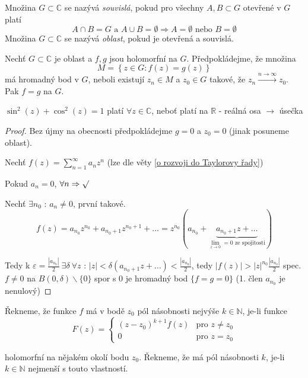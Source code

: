 \begin{definice}
Množina $G \subset \mathbb{C}$ se nazývá \emph{souvislá}, pokud pro všechny $A, B \subset G$ otevřené v $G$ platí
$$A \cap B = G \textrm{ a } A \cup B = \emptyset \Rightarrow A = \emptyset \textrm{ nebo } B = \emptyset$$
Množina $G \subset \mathbb{C}$ se nazývá \emph{oblast}, pokud je otevřená a souvislá.
\end{definice}

\begin{vetal}
Nechť $G \subset \mathbb{C}$ je oblast a $f, g$ jsou holomorfní na $G$. Předpokládejme, že množina
$$M = \left\{ z \in G : f(z)=g(z) \right\} $$
má hromadný bod v $G$, neboli existují $z_n \in M$ a $z_0 \in G$ takové, že $z_n \stackrel{n \rightarrow \infty}{\rightarrow} z_0$. Pak $f=g$ na $G$.
\end{vetal}

\begin{dusledek}
$\sin^2 (z) + \cos^2 (z) = 1$ platí $\forall z \in \mathbb{C}$, neboť platí na $\mathbb{R}$ - reálná osa $\to$ úsečka
\end{dusledek}

\begin{proof}
Bez újmy na obecnosti předpokládejme $g=0$ a $z_0=0$ (jinak posuneme oblast).

Nechť $f(z) = \sum_{n=1}^\infty a_n z^n$ (lze dle věty \ref{o rozvoji do Taylorovy řady})

Pokud $a_n = 0$, $\forall n \Rightarrow \surd$

Nechť $\exists n_0 \textrm{ : } a_n \neq 0$, první takové. 
$$f(z) = a_{n_0} z^{n_0} + a_{n_0 + 1} z^{n_0 + 1} + \ldots = z^{n_0} \left( a_{n_0} + \underbrace{a_{n_0 + 1} z + \ldots}_{\lim_{z \to 0} = 0 \textrm{ ze spojitosti}} \right)$$

Tedy k $\varepsilon = \frac{|a_{n_0}|}{2} \ \exists \delta \ \forall z \textrm{ : } |z| < \delta (a_{n_0 + 1} z + \ldots) < \frac{|a_{n_0}|}{2}$, tedy $|f(z)| > |z|^{n_0} \frac{|a_{n_0}|}{2}$ spec. $f \neq 0$ na $B(0, \delta) \backslash \{ 0 \}$ spor s $0$ je hromadný bod $\{ f = g = 0 \}$ (1. člen $a_{n_0}$ je nenulový)
\end{proof}


\begin{definice}
Řekneme, že funkce $f$ má v bodě $z_0$ pól násobnosti nejvýše $k \in \mathbb{N}$, je-li funkce 
\begin{equation}
F(z) = \left\{ \begin{array}{ll}
 (z-z_0)^{k+1}f(z) & \textrm{pro $z \neq z_0$} \nonumber\\
 0 & \textrm{pro $z=z_0$}
  \end{array} \right.
\end{equation}

holomorfní na nějakém okolí bodu $z_0$. Řekneme, že má pól násobnosti $k$, je-li $k \in \mathbb{N}$ nejmenší s touto vlastností.
\end{definice}


